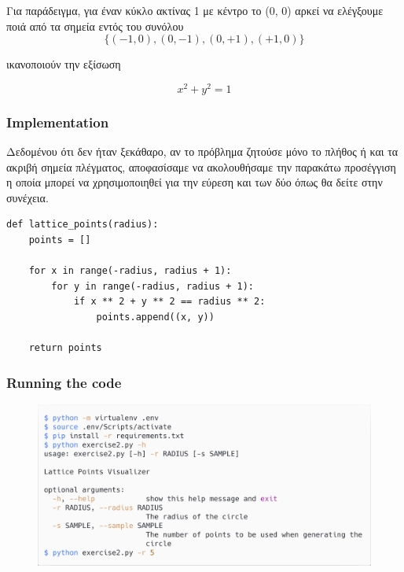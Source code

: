 \documentclass[12pt]{article}
\newenvironment{matlab}
	{\begin{figure}[H]\centering\captionsetup{justification=centering}}
	{\end{figure}}
\begin{document}
Για παράδειγμα, για έναν κύκλο ακτίνας 1 με κέντρο το (0, 0) αρκεί να
ελέγξουμε ποιά από τα σημεία εντός του συνόλου \\

\[ \{ (-1, 0), (0, -1), (0, +1), (+1, 0) \} \]

ικανοποιούν την εξίσωση

\[ x^2 + y^2 = 1 \]

\pagebreak

\subsubsection*{Implementation}

Δεδομένου ότι δεν ήταν ξεκάθαρο, αν το πρόβλημα ζητούσε μόνο
το πλήθος ή και τα ακριβή σημεία πλέγματος,
αποφασίσαμε να ακολουθήσαμε την παρακάτω προσέγγιση η οποία μπορεί να
χρησιμοποιηθεί για την εύρεση και των δύο όπως θα δείτε
στην συνέχεια. \\

\begin{lstlisting}
def lattice_points(radius):
    points = []

    for x in range(-radius, radius + 1):
        for y in range(-radius, radius + 1):
            if x ** 2 + y ** 2 == radius ** 2:
                points.append((x, y))

    return points
\end{lstlisting}

\pagebreak

\subsubsection*{Running the code}

\begin{matlab}
    \includegraphics[scale=0.140]{images/lattice_points.png}
\end{matlab}
\end{document}
